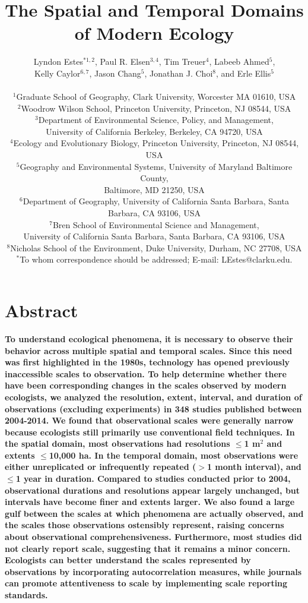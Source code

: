 \documentclass[12pt]{article}
\title{The Spatial and Temporal Domains of Modern Ecology }%
\author
{Lyndon Estes$^{\ast1, 2}$, Paul R. Elsen$^{3, 4}$, Tim Treuer$^{4}$, Labeeb Ahmed$^{5}$, \\
Kelly Caylor$^{6, 7}$, Jason Chang$^{5}$, Jonathan J. Choi$^{8}$, and Erle Ellis$^{5}$ \\
\\
\normalsize{$^{1}$Graduate School of Geography, Clark University, Worcester MA 01610, USA}\\
\normalsize{$^{2}$Woodrow Wilson School, Princeton University, Princeton, NJ 08544, USA}\\
\normalsize{$^{3}$Department of Environmental Science, Policy, and Management,}\\
\normalsize{University of California Berkeley, Berkeley, CA 94720, USA}\\
\normalsize{$^{4}$Ecology and Evolutionary Biology, Princeton University, Princeton, NJ 08544, USA}\\
\normalsize{$^{5}$Geography and Environmental Systems, University of Maryland Baltimore County,}\\ 
\normalsize{Baltimore, MD 21250, USA}\\
\normalsize{$^{6}$Department of Geography, University of California Santa Barbara, Santa Barbara, CA 93106, USA}\\
\normalsize{$^{7}$Bren School of Environmental Science and Management,}\\
\normalsize{University of California Santa Barbara, Santa Barbara, CA 93106, USA}\\
\normalsize{$^{8}$Nicholas School of the Environment, Duke University, Durham, NC 27708, USA}\\
\normalsize{$^\ast$To whom correspondence should be addressed; E-mail:  LEstes@clarku.edu.}}
\date{}
\begin{document}
 


\baselineskip12pt


\maketitle 

\section*{Abstract}
\textbf{To understand ecological phenomena, it is necessary to observe their behavior across multiple spatial and temporal scales. Since this need was first highlighted in the 1980s, technology has opened previously inaccessible scales to observation. To help determine whether there have been corresponding changes in the scales observed by modern ecologists, we analyzed the resolution, extent, interval, and duration of observations (excluding experiments) in 348 studies published between 2004-2014. We found that observational scales were generally narrow because ecologists still primarily use conventional field techniques. In the spatial domain, most observations had resolutions $\leq$1 m$^2$ and extents $\leq$10,000 ha. In the temporal domain, most observations were either unreplicated or infrequently repeated ($>$1 month interval), and $\leq$1 year in duration. Compared to studies conducted prior to 2004, observational durations and resolutions appear largely unchanged, but intervals have become finer and extents larger. We also found a large gulf between the scales at which phenomena are actually observed, and the scales those observations ostensibly represent, raising concerns about observational comprehensiveness. Furthermore, most studies did not clearly report scale, suggesting that it remains a minor concern. Ecologists can better understand the scales represented by observations by incorporating autocorrelation measures, while journals can promote attentiveness to scale by implementing scale reporting standards.}
\end{document}
